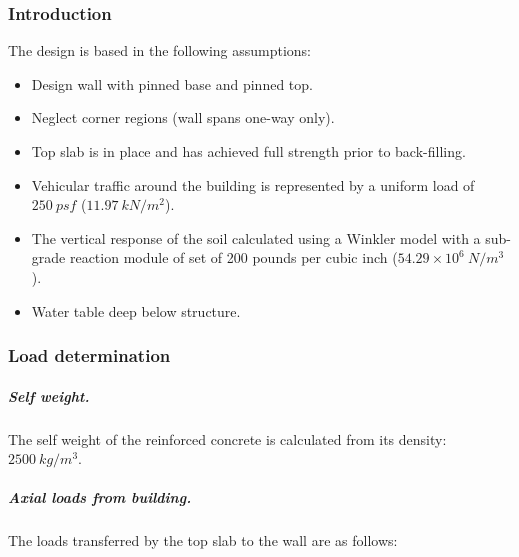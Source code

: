 \subsubsection{Introduction}

The design is based in the following assumptions:

\begin{itemize}
\item Design wall with pinned base and pinned top.
\item Neglect corner regions (wall spans one-way only).
\item Top slab is in place and has achieved full strength prior to back-filling.
\item Vehicular traffic around the building is represented by a uniform load of $250\ psf$ ($11.97\ kN/m^2$).
\item The vertical response of the soil calculated using a Winkler model with a sub-grade reaction module of set of 200 pounds per cubic inch ($54.29 \times 10^6\ N/m^3$).
\item Water table deep below structure.
\end{itemize}

\subsubsection{Load determination}

\subparagraph{Self weight.}
The self weight of the reinforced concrete is calculated from its density: $2500\ kg/m^3$.

\subparagraph{Axial loads from building.}
The loads transferred by the top slab to the wall are as follows:

